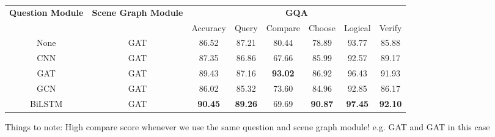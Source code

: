 \begin{table}[htbp]
\centering
\begin{footnotesize}
\begin{tabular}{cc|c|ccccc}
\toprule
\multirow{3}{0.1\textwidth}{\textbf{Question Module}} & \multirow{3}{0.1\textwidth}{\textbf{Scene Graph Module}} & \multicolumn{6}{c}{\multirow{2}{*}{\textbf{GQA}}}                                                   \\
                                          &                                              & \multicolumn{6}{c}{}                                                                                \\ \cmidrule(l){3-8} 
                                          &                                              & Accuracy       & Query          & Compare        & Choose         & Logical        & Verify         \\ \midrule
None                                      & GAT                                          & 86.52          & 87.21          & 80.44          & 78.89          & 93.77          & 85.88          \\
CNN                                       & GAT                                          & 87.35          & 86.86          & 67.66          & 85.99          & 92.57          & 89.17          \\
GAT                                       & GAT                                          & 89.43          & 87.16          & \textbf{93.02} & 86.92          & 96.43          & 91.93          \\
GCN                                       & GAT                                          & 86.02          & 85.32          & 73.60          & 84.96          & 92.85          & 86.17          \\
BiLSTM                                    & GAT                                          & \textbf{90.45} & \textbf{89.26} & 69.69          & \textbf{90.87} & \textbf{97.45} & \textbf{92.10} \\ \bottomrule
\end{tabular}
\end{footnotesize}
\end{table}

{\color{red}Things to note: High compare score whenever we use the same question and scene graph module! e.g. GAT and GAT in this case}


